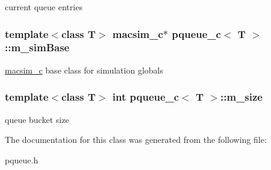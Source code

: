\label{classpqueue__c_a933bd55083a228754eb47655616f0a6d}
current queue entries \hypertarget{classpqueue__c_aa5404c8b094541c557fff49dd6421c79}{
\subsubsection[{m\_\-simBase}]{\setlength{\rightskip}{0pt plus 5cm}template$<$class T$>$ {\bf macsim\_\-c}$\ast$ {\bf pqueue\_\-c}$<$ T $>$::{\bf m\_\-simBase}}}
\label{classpqueue__c_aa5404c8b094541c557fff49dd6421c79}
\hyperlink{classmacsim__c}{macsim\_\-c} base class for simulation globals \hypertarget{classpqueue__c_afa2a0bf3e21a27c89996394e9d1277d7}{
\subsubsection[{m\_\-size}]{\setlength{\rightskip}{0pt plus 5cm}template$<$class T$>$ int {\bf pqueue\_\-c}$<$ T $>$::{\bf m\_\-size}}}
\label{classpqueue__c_afa2a0bf3e21a27c89996394e9d1277d7}
queue bucket size 

The documentation for this class was generated from the following file:\begin{DoxyCompactItemize}
\item 
pqueue.h\end{DoxyCompactItemize}
